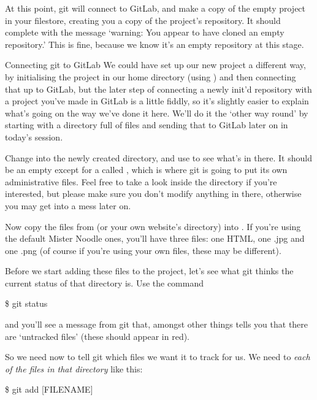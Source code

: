At this point, git will connect to GitLab, and make a copy of the empty  project in your filestore, creating you a copy of the project's repository. It should complete with the message `warning: You appear to have cloned an empty repository.' This is fine, because we know it's an empty repository at this stage.

\begin{diversion}{Connecting git to GitLab}
We could have set up our new project a different way, by initialising the project in our home directory (using ) and then connecting that up to GitLab, but the later step of connecting a newly init'd repository with a project you've made in GitLab is a little fiddly, so it's slightly easier to explain what's going on the way we've done it here. We'll do it the `other way round' by starting with a directory full of files and sending that to GitLab later on in today's session. 
\end{diversion}

Change into the newly created  directory, and use  to see what's in there. It should be an empty except for a  called , which is where git is going to put its own administrative files. Feel free to take a look inside the  directory if you're interested, but please make sure you don't modify anything in there, otherwise you may get into a mess later on. 

Now copy the files from  (or your own website's directory) into . If you're using the default Mister Noodle ones, you'll have three files: one HTML, one .jpg and one .png (of course if you're using your own files, these may be different). 

Before we start adding these files to the project, let's see what git thinks the current status of that directory is. Use the  command 

\begin{ttoutenv}
\$ git status
\end{ttoutenv}

and you'll see a message from git that, amongst other things tells you that there are `untracked files' (these should appear in red). 

So we need now to tell git which files we want it to track for us. We need to  \emph{each of the files in that directory} like this:

\begin{ttoutenv}
\$ git add [FILENAME]
\end{ttoutenv}

